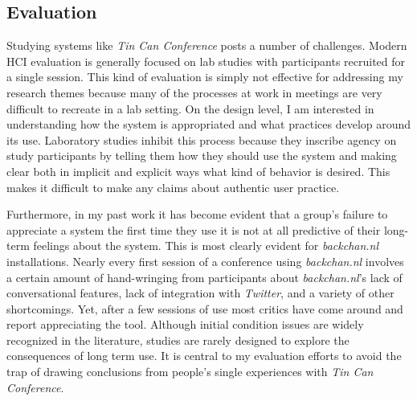 \documentclass{tufte-handout}
\begin{document}
\subsection{Evaluation}

Studying systems like \emph{Tin Can Conference} posts a number of challenges. Modern HCI evaluation is generally focused on lab studies with participants recruited for a single session. This kind of evaluation is simply not effective for addressing my research themes because many of the processes at work in meetings are very difficult to recreate in a lab setting. On the design level, I am interested in understanding how the system is appropriated and what practices develop around its use. Laboratory studies inhibit this process because they inscribe agency on study participants by telling them how they should use the system and making clear both in implicit and explicit ways what kind of behavior is desired. This makes it difficult to make any claims about authentic user practice.

Furthermore, in my past work it has become evident that a group's failure to appreciate a system the first time they use it is not at all predictive of their long-term feelings about the system. This is most clearly evident for \emph{backchan.nl} installations. Nearly every first session of a conference using \emph{backchan.nl} involves a certain amount of hand-wringing from participants about \emph{backchan.nl}'s lack of conversational features, lack of integration with \emph{Twitter}, and a variety of other shortcomings. Yet, after a few sessions of use most critics have come around and report appreciating the tool. Although initial condition issues are widely recognized in the literature, studies are rarely designed to explore the consequences of long term use. It is central to my evaluation efforts to avoid the trap of drawing conclusions from people's single experiences with \emph{Tin Can Conference}.
\end{document}
